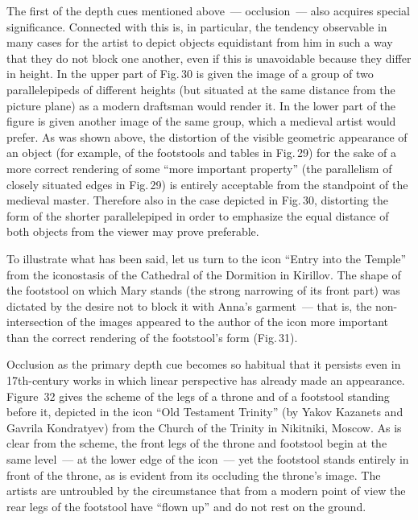 The first of the depth cues mentioned above~--- occlusion~--- also acquires special
significance.  Connected with this is, in particular, the tendency observable in many
cases for the artist to depict objects equidistant from him in such a way that they do
not block one another, even if this is unavoidable because they differ in height.  In the
upper part of Fig.\,30 is given the image of a group of two parallelepipeds of different
heights (but situated at the same distance from the picture plane) as a modern
draftsman would render it.  In the lower part of the figure is given another image of
the same group, which a medieval artist would prefer.  As was shown above, the
distortion of the visible geometric appearance of an object (for example, of the
footstools and tables in Fig.\,29) for the sake of a more correct rendering of some
``more important property'' (the parallelism of closely situated edges in Fig.\,29) is
entirely acceptable from the standpoint of the medieval master.  Therefore also in the
case depicted in Fig.\,30, distorting the form of the shorter parallelepiped in order to
emphasize the equal distance of both objects from the viewer may prove preferable.


To illustrate what has been said, let us turn to the icon ``Entry into the Temple'' from
the iconostasis of the Cathedral of the Dormition in Kirillov.  The shape of the
footstool on which Mary stands (the strong narrowing of its front part) was dictated
by the desire not to block it with Anna's garment~--- that is, the non-intersection of
the images appeared to the author of the icon more important than the correct rendering
of the footstool's form (Fig.\,31).


Occlusion as the primary depth cue becomes so habitual that it persists even in
17th-century works in which linear perspective has already made an appearance.
Figure~32 gives the scheme of the legs of a throne and of a footstool standing before
it, depicted in the icon ``Old Testament Trinity'' (by Yakov Kazanets and Gavrila
Kondratyev) from the Church of the Trinity in Nikitniki, Moscow.  As is clear from
the scheme, the front legs of the throne and footstool begin at the same level~--- at the
lower edge of the icon~--- yet the footstool stands entirely in front of the throne, as is
evident from its occluding the throne's image.  The artists are untroubled by the
circumstance that from a modern point of view the rear legs of the footstool have
``flown up'' and do not rest on the ground.

